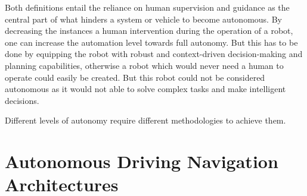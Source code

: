 Both definitions entail the reliance on human supervision and guidance as the central part of what hinders a system or vehicle to become autonomous. By decreasing the instances a human intervention during the operation of a robot, one can increase the automation level towards full autonomy. But this has to be done by equipping the robot with robust and context-driven decision-making and planning capabilities, otherwise a robot which would never need a human to operate could easily be created. But this robot could not be considered autonomous as it would not able to solve complex tasks and make intelligent decisions.

Different levels of autonomy require different methodologies to achieve them. 




\section{Autonomous Driving Navigation Architectures}

